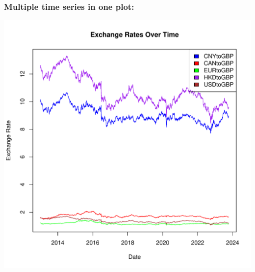 \documentclass{article}\usepackage[]{graphicx}\usepackage[]{xcolor}
\makeatletter
\def\maxwidth{ %
  \ifdim\Gin@nat@width>\linewidth
    \linewidth
  \else
    \Gin@nat@width
  \fi
}
\newenvironment{knitrout}{}{} %
\makeatother
\begin{document}
\subsubsection{Multiple time series in one plot:}

\begin{knitrout}
\color{fgcolor}
\includegraphics[width=\maxwidth]{figure/unnamed-chunk-1-1} 
\end{knitrout}
\end{document}
